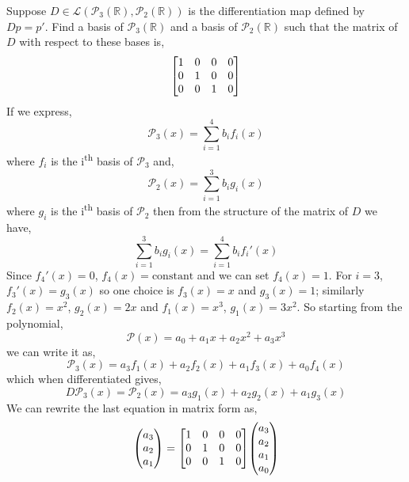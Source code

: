 \documentclass[11pt,a4paper]{scrartcl}
\newcommand{\lmap}[2]{\mathcal{L}(#1,#2)}
\newcounter{problem}
\begin{document}
\begin{problem}[3.C.2]
{
    Suppose $D \in \lmap{\mathcal{P}_3(\mathbb{R})}{\mathcal{P}_2(\mathbb{R})}$ is the differentiation map defined by
    $Dp=p'$. Find a basis of $\mathcal{P}_3(\mathbb{R})$ and a basis of
    $\mathcal{P}_2(\mathbb{R})$ such that the matrix of $D$ with
    respect to these bases is,
    \[
        \mqty[
        1 & 0 & 0 & 0 \\
        0 & 1 & 0 & 0 \\
        0 & 0 & 1 & 0 \\        
        ]
    \]
}
{
    If we express,
    \[
    \mathcal{P}_3(x)=\sum_{i=1}^4 b_i f_i(x)
    \]
    where $f_i$ is the i\textsuperscript{th} basis of $\mathcal{P}_3$ and,
    \[
    \mathcal{P}_2(x)=\sum_{i=1}^3 b_i g_i(x)
    \]    
    where $g_i$ is the i\textsuperscript{th} basis of $\mathcal{P}_2$
    then from the structure of the matrix of $D$ we have,
    \[
    \sum_{i=1}^3 b_i g_i(x) = \sum_{i=1}^4 b_i f_i'(x)
    \]
    Since $f_4'(x)=0$, $f_4(x)=\mathrm{constant}$ and we can set
    $f_4(x)=1$. For $i=3$, $f_3'(x)=g_3(x)$ so one choice is 
    $f_3(x)=x$ and $g_3(x)=1$; similarly $f_2(x)=x^2$, $g_2(x)=2x$
    and $f_1(x)=x^3$, $g_1(x)=3x^2$. So starting from the polynomial,
    \[
    \mathcal{P}(x)=a_0+a_1x+a_2x^2+a_3x^3
    \]
    we can write it as,
    \[
    \mathcal{P}_3(x)=a_3 f_1(x)+ a_2 f_2(x) + a_1 f_3(x) + a_0 f_4(x)
    \]
    which when differentiated gives,
    \[
    D\mathcal{P}_3(x)=\mathcal{P}_2(x)=a_3 g_1(x)+ a_2 g_2(x) + a_1 g_3(x)   
    \]
    We can rewrite the last equation in matrix form as,
    \[
    \mqty(a_3 \\ a_2 \\ a_1)
    =
           \mqty[
        1 & 0 & 0 & 0 \\
        0 & 1 & 0 & 0 \\
        0 & 0 & 1 & 0 \\        
        ] 
     \mqty(a_3 \\ a_2 \\ a_1 \\ a_0)   
    \]
}
\end{problem}
\end{document}
